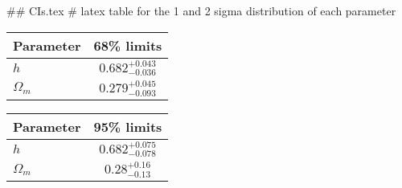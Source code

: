 ## CIs.tex
# latex table for the 1 and 2 sigma distribution of each parameter

\begin{tabular} { l  c}
 Parameter &  68\% limits\\
\hline
{\boldmath$h              $} & $0.682^{+0.043}_{-0.036}   $\\
{\boldmath$\Omega_m       $} & $0.279^{+0.045}_{-0.093}   $\\
\hline
\end{tabular}

\begin{tabular} { l  c}
 Parameter &  95\% limits\\
\hline
{\boldmath$h              $} & $0.682^{+0.075}_{-0.078}   $\\
{\boldmath$\Omega_m       $} & $0.28^{+0.16}_{-0.13}      $\\
\hline
\end{tabular}
